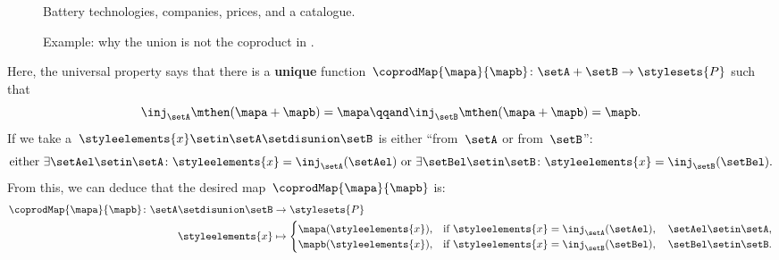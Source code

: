 \begin{example}
    \begin{figure*}[tbh]
        \centering
        \caption{Battery technologies, companies, prices, and a catalogue.}
        \label{fig:coprod_batteries_1}
    \end{figure*}

    \begin{figure*}[tbh]
        \centering
        \caption{Example: why the union is not the coproduct in \Set.}
        \label{fig:coprod_batteries_2}
    \end{figure*}

    Here, the universal property says that there is a \textbf{unique} function~$\coprodMap{\mapa}{\mapb}\colon \setA+\setB\to \stylesets{P}$ such that
    \begin{equation}
        \label{eq:exa-batt-factoring-maps}
        \inj_\setA\mthen (\mapa+ \mapb)=\mapa
        \qqand
        \inj_\setB\mthen (\mapa+ \mapb)=\mapb.
    \end{equation}
    If we take a~$\styleelements{x}\setin \setA \setdisunion \setB$ is either ``from~$\setA$ or from~$\setB$'':
    \begin{equation}
        \label{eq:exa-batt-explain-sum-map}
        \text{either } \exists \setAel\setin \setA\colon \styleelements{x}=\inj_\setA(\setAel) \text{ or }\exists \setBel\setin \setB\colon \styleelements{x}=\inj_\setB(\setBel).
    \end{equation}
    From this, we can deduce that the desired map~$\coprodMap{\mapa}{\mapb}$ is:
    \begin{equation}
        \label{eq:exa-batt-def-sum-map}
        \begin{aligned}
            \coprodMap{\mapa}{\mapb} \colon  \setA \setdisunion \setB & \to \stylesets{P} \\
            \styleelements{x}                                         & \mapsto
            \begin{cases}
                \mapa(\styleelements{x}), & \text{if } \styleelements{x}=\inj_\setA(\setAel),\quad \setAel \setin \setA, \\
                \mapb(\styleelements{x}), & \text{if } \styleelements{x}=\inj_\setB(\setBel),\quad \setBel \setin \setB.
            \end{cases}
        \end{aligned}
    \end{equation}

\end{example}
